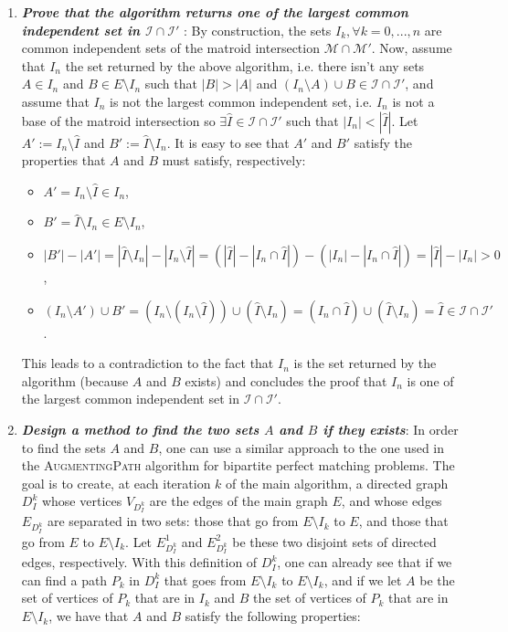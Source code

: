 \documentclass[10pt]{article}
\newenvironment{exercise}[2][Exercise]{\begin{trivlist}
  \item[\hskip \labelsep {\bfseries #1}\hskip \labelsep {\bfseries #2.}]}{\end{trivlist}}
\begin{document}
\begin{exercise}{2b}
\begin{enumerate}
\item \textbf{\emph{Prove that the algorithm returns one of the largest common independent set in $\mathcal{I}\cap\mathcal{I}'$}} :
\newline
By construction, the sets $I_k, \forall k = 0,...,n$ are common independent sets of the matroid intersection $\mathcal{M}\cap\mathcal{M}'$. Now, assume that $I_n$ the set returned by the above algorithm, i.e. there isn't any sets $A \in I_n$ and $B \in E \setminus I_n$ such that $|B| > |A|$ and $(I_n\setminus A) \cup B \in \mathcal{I} \cap \mathcal{I}'$, and assume that $I_n$ is not the largest common independent set, i.e. $I_n$ is not a base of the matroid intersection so $\exists\hat{I}\in \mathcal{I} \cap \mathcal{I}'$ such that $|I_n| < |\hat{I}|$. Let $A':= I_n \setminus \hat{I}$ and $B':= \hat{I}\setminus I_n$. It is easy to see that $A'$ and $B'$ satisfy the properties that $A$ and $B$ must satisfy, respectively:
\begin{itemize}
\item $A'=I_n \setminus \hat{I} \in I_n$,
\item $B'=\hat{I} \setminus I_n \in E\setminus I_n$,
\item $|B'| - |A'| = |\hat{I} \setminus I_n| - |I_n\setminus \hat{I}| = (|\hat{I}| - |I_n\cap \hat{I}|) - (|I_n| - |I_n\cap \hat{I}|) = |\hat{I}|-|I_n| > 0$,
\item $(I_n \setminus A')\cup B' = (I_n \setminus (I_n \setminus \hat{I}))\cup (\hat{I} \setminus I_n)= (I_n \cap \hat{I})\cup (\hat{I}\setminus I_n) = \hat{I} \in \mathcal{I}\cap\mathcal{I}'$.
\end{itemize} 
This leads to a contradiction to the fact that $I_n$ is the set returned by the algorithm (because $A$ and $B$ exists) and concludes the proof that $I_n$ is  one of the largest common independent set in $\mathcal{I}\cap\mathcal{I}'$.
\item \textbf{\emph{Design a method to find the two sets $A$ and $B$ if they exists}}: 
\newline
In order to find the sets $A$ and $B$, one can use a similar approach to the one used in the \textsc{AugmentingPath} algorithm for bipartite perfect matching problems. The goal is to create, at each iteration $k$ of the main algorithm, a directed graph $D_I^k$ whose vertices $V_{D_I^k}$ are the edges of the main graph $E$, and whose edges $E_{D_I^k} $ are separated in two sets: those that go from $E\setminus I_k $ to  $E$, and those that go from $E$ to $E\setminus I_k $. Let $E_{D_I^k}^1$ and $E_{D_I^k}^2$ be these two disjoint sets of directed edges, respectively. With this definition of $D_{I}^k$, one can already see that if we can find a path $P_k$ in $D_{I}^k$ that goes from $E\setminus I_k$ to $E\setminus I_k$, and if we let $A$ be the set of vertices of $P_k$ that are in $I_k$ and $B$ the set of vertices of $P_k$ that are in $E\setminus I_k$, we have that $A$ and $B$ satisfy the following properties:

\end{enumerate}
\end{exercise}
\end{document}
